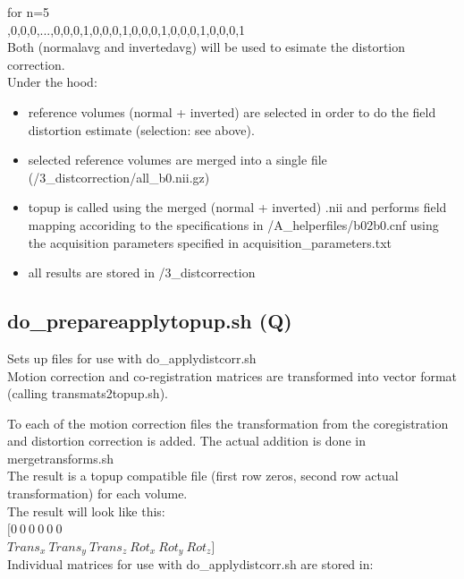 \documentclass[12pt,a4paper]{scrartcl}
\begin{document}
\noindent for n=5\\

,0,0,0,...,0,0,0,1,0,0,0,1,0,0,0,1,0,0,0,1,0,0,0,1\\

\noindent Both (normalavg and invertedavg) will be used to esimate the distortion correction.\\

\noindent Under the hood:
\begin{itemize}
\item reference volumes (normal + inverted) are selected in order to do the field distortion estimate (selection: see above).
\item selected reference volumes are merged into a single file (/3\_distcorrection/all\_b0.nii.gz)
\item topup is called using the merged (normal + inverted) .nii and performs field mapping accoriding to the specifications in /A\_helperfiles/b02b0.cnf using the acquisition parameters specified in acquisition\_parameters.txt
\item all results are stored in /3\_distcorrection
\end{itemize}

\subsection{do\_prepareapplytopup.sh (Q)}
Sets up files for use with do\_applydistcorr.sh \\

\noindent Motion correction and co-registration matrices are transformed into vector format (calling transmats2topup.sh). 

\noindent To each of the motion correction files the transformation from the coregistration and distortion correction is added. The actual addition is done in mergetransforms.sh \\

\noindent The result is a topup compatible file (first row zeros, second row actual transformation) for each volume.\\

\noindent The result will look like this:\\

\noindent $[0~0~0~0~0~0$ \\$Trans_x~Trans_y~Trans_z~Rot_x~Rot_y~Rot_z]$\\

\noindent Individual matrices for use with do\_applydistcorr.sh are stored in:\\
\end{document}
